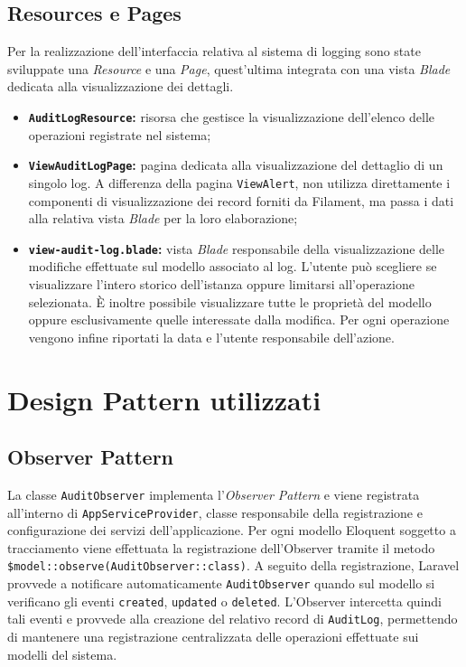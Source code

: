 \subsection{Resources e Pages}
Per la realizzazione dell'interfaccia relativa al sistema di logging sono state sviluppate una \textit{Resource} e una \textit{Page}, quest'ultima integrata con una vista 
\textit{Blade} dedicata alla visualizzazione dei dettagli.
\begin{itemize}
  \item \textbf{\texttt{AuditLogResource}:} risorsa che gestisce la visualizzazione dell'elenco delle operazioni registrate nel sistema;
  \item \textbf{\texttt{ViewAuditLogPage}:} pagina dedicata alla visualizzazione del dettaglio di un singolo log. A differenza della pagina \texttt{ViewAlert}, non utilizza 
    direttamente i componenti di visualizzazione dei record forniti da Filament, ma passa i dati alla relativa vista \textit{Blade} per la loro elaborazione;
  \item \textbf{\texttt{view-audit-log.blade}:} vista \textit{Blade} responsabile della visualizzazione delle modifiche effettuate sul modello associato al log. L'utente può 
    scegliere se visualizzare l'intero storico dell'istanza oppure limitarsi all'operazione selezionata. È inoltre possibile visualizzare tutte le proprietà del modello oppure 
    esclusivamente quelle interessate dalla modifica. Per ogni operazione vengono infine riportati la data e l'utente responsabile dell'azione.
\end{itemize}

\section{Design Pattern utilizzati}
\subsection{Observer Pattern}
La classe \texttt{AuditObserver} implementa l'\textit{Observer Pattern} e viene registrata all'interno di \texttt{AppServiceProvider}, classe responsabile della registrazione 
e configurazione dei servizi dell'applicazione. Per ogni modello Eloquent soggetto a tracciamento viene effettuata la registrazione dell'Observer tramite il metodo 
\texttt{\$model::observe(AuditObserver::class)}.
\newline
A seguito della registrazione, Laravel provvede a notificare automaticamente \texttt{AuditObserver} quando sul modello si verificano gli eventi \texttt{created}, 
\texttt{updated} o \texttt{deleted}. L'Observer intercetta quindi tali eventi e provvede alla creazione del relativo record di \texttt{AuditLog}, permettendo di mantenere 
una registrazione centralizzata delle operazioni effettuate sui modelli del sistema.

